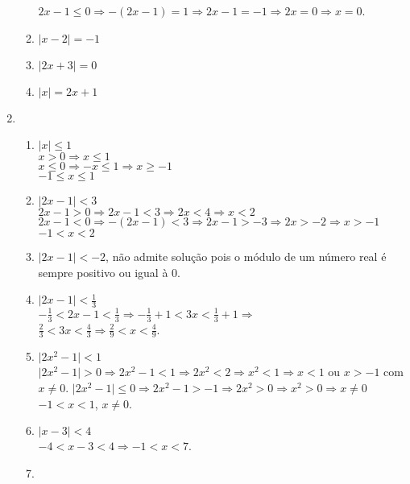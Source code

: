 \documentclass[10pt]{book}
\begin{document}
\begin{enumerate}
\begin{enumerate}
		$2x - 1 \leq 0 \Rightarrow -(2x - 1) = 1 \Rightarrow 2x - 1 = -1 \Rightarrow 2x = 0 \Rightarrow x = 0$.	
		\item %
		$\vert x - 2 \vert = -1$
		\item %
		$\vert2x + 3 \vert = 0$
		\item %
		$\vert x \vert = 2x + 1$
	\end{enumerate}
	\item %
	\begin{enumerate}
		\setcounter{enumii}{0}
		\item %
		$\vert x \vert \leq 1$\\
		$ x > 0 \Rightarrow x \leq 1$\\
		$ x \leq 0 \Rightarrow -x \leq 1 \Rightarrow x \geq -1$\\
		$-1 \leq x \leq 1$
		\item %
		$\vert 2x - 1 \vert < 3$\\		
		$2x - 1 > 0 \Rightarrow 2x - 1 < 3 \Rightarrow 2x < 4 \Rightarrow x < 2$\\
		$2x - 1 < 0 \Rightarrow -(2x - 1) < 3 \Rightarrow 2x - 1 > -3  \Rightarrow 2x > -2 \Rightarrow x > -1$\\
		$-1 < x < 2$\\
		\item %
		$\vert 2x - 1 \vert < -2$, não admite solução pois o módulo de um número real é sempre positivo ou igual à 0.
		\item %
		$\vert 2x - 1 \vert < \frac{1}{3}$\\
		$-\frac{1}{3} < 2x - 1 < \frac{1}{3} \Rightarrow -\frac{1}{3} + 1 < 3x < \frac{1}{3} + 1 \Rightarrow$\\
		$\frac{2}{3} < 3x < \frac{4}{3} \Rightarrow \frac{2}{9} < x < \frac{4}{9}$.
		\item %
		$\vert 2x^2 - 1 \vert < 1$\\
		$\vert 2x^2 - 1 \vert > 0 \Rightarrow 2x^2 - 1 < 1 \Rightarrow 2x^2 < 2 \Rightarrow x^2 < 1 \Rightarrow x < 1$ ou $x > -1$ com $x \neq 0$.
		$\vert 2x^2 - 1 \vert \leq 0 \Rightarrow 2x^2 - 1 > -1 \Rightarrow 2x^2 > 0 \Rightarrow x^2 > 0 \Rightarrow x \neq 0$\\
		$-1 < x < 1$, $x \neq 0$.
		\item %
		$\vert x - 3 \vert < 4$\\
		$-4 <  x - 3 < 4 \Rightarrow -1 < x < 7$.
		\item %

\end{enumerate}
\end{enumerate}
\end{document}
